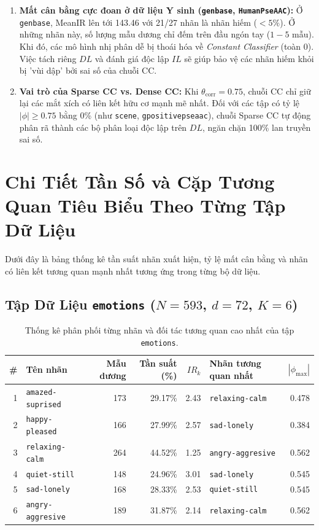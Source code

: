 \documentclass[11pt,a4paper]{article}
\begin{document}
\begin{enumerate}[leftmargin=*]
\begin{itemize}
  \end{itemize}
  \item \textbf{Mất cân bằng cực đoan ở dữ liệu Y sinh (\texttt{genbase}, \texttt{HumanPseAAC}):}
  Ở \texttt{genbase}, MeanIR lên tới 143.46 với 21/27 nhãn là nhãn hiếm ($< 5\%$). Ở những nhãn này, số lượng mẫu dương chỉ đếm trên đầu ngón tay ($1 - 5$ mẫu). Khi đó, các mô hình nhị phân dễ bị thoái hóa về \textit{Constant Classifier} (toàn 0). Việc tách riêng $DL$ và đánh giá độc lập $IL$ sẽ giúp bảo vệ các nhãn hiếm khỏi bị 'vùi dập' bởi sai số của chuỗi CC.
  \item \textbf{Vai trò của Sparse CC vs. Dense CC:}
  Khi $\theta_{\text{corr}} = 0.75$, chuỗi CC chỉ giữ lại các mắt xích có liên kết hữu cơ mạnh mẽ nhất. Đối với các tập có tỷ lệ $|\phi| \ge 0.75$ bằng 0\% (như \texttt{scene}, \texttt{gpositivepseaac}), chuỗi Sparse CC tự động phân rã thành các bộ phân loại độc lập trên $DL$, ngăn chặn 100\% lan truyền sai số.
\end{enumerate}

\section{Chi Tiết Tần Số và Cặp Tương Quan Tiêu Biểu Theo Từng Tập Dữ Liệu}
Dưới đây là bảng thống kê tần suất nhãn xuất hiện, tỷ lệ mất cân bằng và nhãn có liên kết tương quan mạnh nhất tương ứng trong từng bộ dữ liệu.

\subsection{Tập Dữ Liệu \texttt{emotions} ($N=593$, $d=72$, $K=6$)}
\begin{table}[htbp]
\centering
\footnotesize
\caption{Thống kê phân phối từng nhãn và đối tác tương quan cao nhất của tập \texttt{emotions}.}
\begin{tabularx}{0.95\textwidth}{r l r r r l r}
\toprule
\textbf{\#} & \textbf{Tên nhãn} & \textbf{Mẫu dương} & \textbf{Tần suất (\%)} & \textbf{$IR_k$} & \textbf{Nhãn tương quan nhất} & \textbf{$|\phi_{\max}|$} \\
\midrule
1 & \texttt{amazed-suprised} & 173 & 29.17\% & 2.43 & \texttt{relaxing-calm} & 0.478 \\
2 & \texttt{happy-pleased} & 166 & 27.99\% & 2.57 & \texttt{sad-lonely} & 0.384 \\
3 & \texttt{relaxing-calm} & 264 & 44.52\% & 1.25 & \texttt{angry-aggresive} & 0.562 \\
4 & \texttt{quiet-still} & 148 & 24.96\% & 3.01 & \texttt{sad-lonely} & 0.545 \\
5 & \texttt{sad-lonely} & 168 & 28.33\% & 2.53 & \texttt{quiet-still} & 0.545 \\
6 & \texttt{angry-aggresive} & 189 & 31.87\% & 2.14 & \texttt{relaxing-calm} & 0.562 \\
\bottomrule
\end{tabularx}
\end{table}
\end{document}
